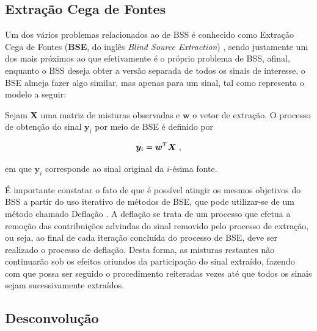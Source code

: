\subsection{Extração Cega de Fontes}
\label{subsec:bss_bse}

Um dos vários problemas relacionados ao de BSS é conhecido como Extração Cega de Fontes (\textbf{BSE}, do inglês \textit{Blind Source Extraction}) \citep{5967775}, sendo justamente um dos mais próximos ao que efetivamente é o próprio problema de BSS, afinal, enquanto o BSS deseja obter a versão separada de todos os sinais de interesse, o BSE almeja fazer algo similar, mas apenas para um sinal, tal como representa o modelo a seguir: \\


\begin{definition}

    Sejam $\bm{X}$ uma matriz de misturas observadas e $\bm{w}$ o vetor de extração. O processo de obtenção do sinal $\bm{y}_{i}$ por meio de BSE é definido por

    \begin{equation}
        \bm{y}_{i} = \bm{w}^{T} \bm{X}
        \label{eq:bss_bse}
        \hspace{0.1cm},
        \vspace{0.2cm}
    \end{equation}

    \noindent em que $\bm{y}_{i}$ corresponde ao sinal original da $i$-ésima fonte.

\end{definition}

É importante constatar o fato de que é possível atingir os mesmos objetivos do BSS a partir do uso iterativo de métodos de BSE, que pode utilizar-se de um método chamado Deflação \citep{DELFOSSE199559}. A deflação se trata de um processo que efetua a remoção das contribuições advindas do sinal removido pelo processo de extração, ou seja, ao final de cada iteração concluída do processo de BSE, deve ser realizado o processo de deflação. Desta forma, as misturas restantes não continuarão sob os efeitos oriundos da participação do sinal extraído, fazendo com que possa ser seguido o procedimento reiteradas vezes até que todos os sinais sejam sucessivamente extraídos.



\subsection{Desconvolução}
\label{subsec:bss_deconvolution}

